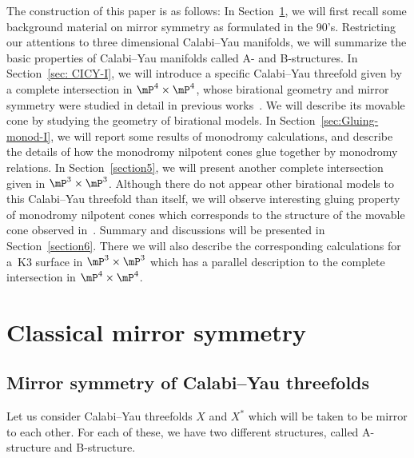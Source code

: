 \documentclass[pdftex]{sigma}
\numberwithin{equation}{section}
\begin{document}
The construction of this paper is as follows: In Section~\ref{sec:Classical-MS}, we will first recall some background material on mirror symmetry as formulated in the 90's. Restricting our attentions to three dimensional Calabi--Yau manifolds, we will summarize the basic properties of Calabi--Yau manifolds called A- and B-structures. In Section~\ref{sec: CICY-I}, we will introduce a specific Calabi--Yau threefold given by a complete intersection in $\mP^{4}\times\mP^{4}$, whose birational geometry and mirror symmetry were studied in detail in previous works~\cite{HTcmp, HTjag}. We will describe its movable cone by studying the geometry of birational models. In Section~\ref{sec:Gluing-monod-I}, we will report some results of monodromy calculations, and describe the details of how the monodromy nilpotent cones glue together by monodromy relations. In Section~\ref{section5}, we will present another complete intersection given in $\mP^{3}\times\mP^{3}$. Although there do not appear other birational models to this Calabi--Yau threefold than itself, we will observe interesting gluing property of monodromy nilpotent cones which corresponds to the structure of the movable cone observed in~\cite{Oguiso1}. Summary and discussions will be presented in Section~\ref{section6}. There we will also describe the corresponding calculations for a~K3 surface in $\mP^{3}\times\mP^{3}$ which has a parallel description to the complete intersection in $\mP^{4}\times\mP^{4}$.

\section{Classical mirror symmetry} \label{sec:Classical-MS}

\subsection{Mirror symmetry of Calabi--Yau threefolds}

Let us consider Calabi--Yau threefolds $X$ and $X^{*}$ which will be taken to be mirror to each other. For each of these, we have two different structures, called A-structure and B-structure.
\end{document}
